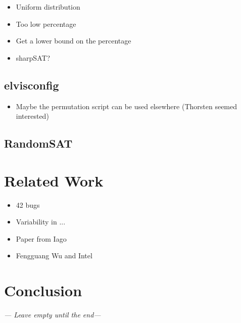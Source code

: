 \documentclass[a4paper,11pt]{article}
\begin{document}
\begin{itemize}
    \item Uniform distribution
    \item Too low percentage
    \item Get a lower bound on the percentage
    \item sharpSAT?
\end{itemize}

\subsection{elvisconfig}

\begin{itemize}
    \item Maybe the permutation script can be used elsewhere (Thorsten seemed 
        interested)
\end{itemize}

\subsection{RandomSAT}





\newpage
\section{Related Work}

\begin{itemize}
    \item 42 bugs
    \item Variability in ...
    \item Paper from Iago
    \item Fengguang Wu and Intel
\end{itemize}



\newpage
\section{Conclusion}
\emph{--- Leave empty until the end---}




\newpage

\end{document}
